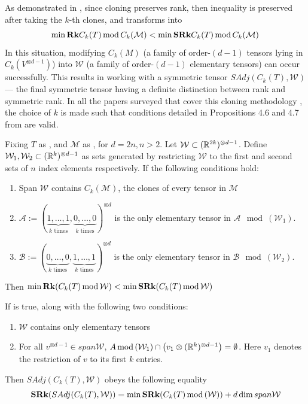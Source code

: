 \documentclass[../Lael_John_MasterThesis_Draft.tex]{subfiles}
\begin{document}
As demonstrated in , since cloning preserves rank, then inequality is preserved after taking the $k$-th clones, and transforms into \begin{equation}\label{eqn:clonedfamilyineq}
    \min\textbf{Rk} C_k(T) \text{\,mod\,} C_k(\mathcal{M}) < \min \textbf{SRk} C_k(T) \text{\,mod\,} C_k(\mathcal{M})
\end{equation}
In this situation, modifying $C_k(M)$ (a family of order-$(d-1)$ tensors lying in $C_k(V^{\otimes d-1})$) into $\mathcal{W}$ (a family of order-$(d-1)$ elementary tensors) can occur successfully. This results in working with a symmetric tensor $SAdj(C_k(T), \mathcal{W})$ --- the final symmetric tensor having a definite distinction between rank and symmetric rank. In all the papers surveyed that cover this cloning methodology \cites{shitov_comons_2020,wang_lower_2023,shitov_higher_2024-1}, the choice of $k$ is made such that conditions detailed in Propositions 4.6 and 4.7 from \cite{wang_lower_2023} are valid. 

\begin{proposition}\label{proposition:wangemulatingfamily}
    Fixing $T$ as , and $\mathcal{M}$ as , for $d = 2n, n > 2$. Let $\mathcal{W} \subset (\mathbb{R}^{2k})^{\otimes d-1}$. Define $\mathcal{W}_1, \mathcal{W}_2 \subset (\mathbb{R}^k)^{\otimes d-1}$ as sets generated by restricting $\mathcal{W}$ to the first and second sets of $n$ index elements respectively.  If the following conditions hold: \begin{enumerate}
        \item Span $\mathcal{W}$ contains $C_k(\mathcal{M})$, the clones of every tensor in $\mathcal{M}$
        \item $\mathcal{A}:= (\underbrace{1, \ldots, 1}_{\text{$k$ times}}, \underbrace{0, \ldots, 0}_{\text{$k$ times}})^{\otimes d}$ is the only elementary tensor in $\mathcal{A}\mod(\mathcal{W}_1)$.
        \item $\mathcal{B}:= (\underbrace{0, \ldots, 0}_{\text{$k$ times}}, \underbrace{1, \ldots, 1}_{\text{$k$ times}})^{\otimes d}$ is the only elementary tensor in $\mathcal{B}\mod(\mathcal{W}_2)$. 
    \end{enumerate}
    Then $\min \textbf{Rk}(C_k(T) \text{\,mod\,} \mathcal{W}) < \min \textbf{SRk}(C_k(T) \text{\,mod\,} \mathcal{W})$ 
\end{proposition}
\begin{proposition}
    If  is true, along with the following two conditions: \begin{enumerate}
        \item $\mathcal{W}$ contains only elementary tensors
        \item For all $v^{\otimes d-1} \in span \mathcal{W}$, $A\text{\,mod\,}(\mathcal{W}_1) \cap \left(v_1 \otimes (\mathbb{R}^k)^{\otimes d-1} \right) = \emptyset$. Here $v_1$ denotes the restriction of $v$ to its first $k$ entries.
    \end{enumerate}
    Then $SAdj(C_k(T), \mathcal{W})$ obeys the following equality $$\textbf{SRk}(SAdj(C_k(T), \mathcal{W})) = \min \textbf{SRk}(C_k(T)\text{\,mod\,}(\mathcal{W})) + d \dim span \mathcal{W}$$
\end{proposition}
\end{document}
